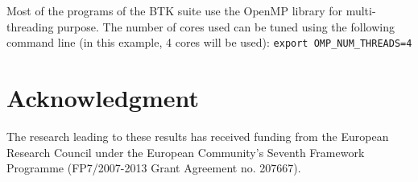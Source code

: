 \documentclass[a4paper,10pt]{article}
\begin{document}
Most of the programs of the BTK suite use the OpenMP library for multi-threading
purpose. The number of cores used can be tuned using the following command line
(in this example, 4 cores will be used): \texttt{export OMP\_NUM\_THREADS=4}




\section*{Acknowledgment}
\small{The research leading to these results has received funding from the
European Research Council under the European Community’s Seventh Framework
Programme (FP7/2007-2013 Grant Agreement no. 207667).}



\end{document}

